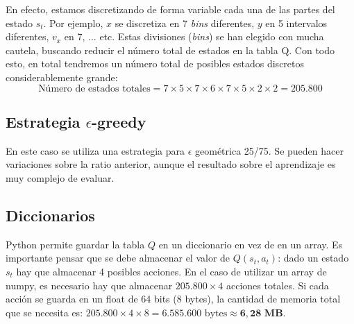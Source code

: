 \documentclass{article}
\begin{document}



En efecto, estamos discretizando de forma variable cada una de las partes del estado $s_t$. Por ejemplo, $x$ se discretiza en 7 \textit{bins} diferentes, $y$ en 5 intervalos diferentes, $v_x$ en 7, ... etc. Estas divisiones (\textit{bins}) se han elegido con mucha cautela, buscando reducir el número total de estados en la tabla Q. Con todo esto, en total tendremos un número total de posibles estados discretos considerablemente grande:
$$\text{Número de estados totales} = 7 \times 5 \times 7 \times 6 \times 7 \times 5 \times 2 \times 2=\mathbf{205.800}$$


\subsection{Estrategia $\epsilon$-greedy}
En este caso se utiliza una estrategia para $\epsilon$ geométrica 25/75. Se pueden hacer variaciones sobre la ratio anterior, aunque el resultado sobre el aprendizaje es muy complejo de evaluar.



\subsection{Diccionarios}
Python permite guardar la tabla $Q$ en un diccionario en vez de en un array. Es importante pensar que se debe almacenar el valor de $Q(s_t, a_t)$: dado un estado $s_t$ hay que almacenar 4 posibles acciones.
En el caso de utilizar un array de numpy, es necesario hay que almacenar $\mathbf{205.800}\times4$ acciones totales. Si cada acción se guarda en un float de 64 bits (8 bytes), la cantidad de memoria total que se necesita es: $\mathbf{205.800}\times4\times8=6.585.600 \text{ bytes} \approx \mathbf{6,28 \text{ MB}}$.
\end{document}
